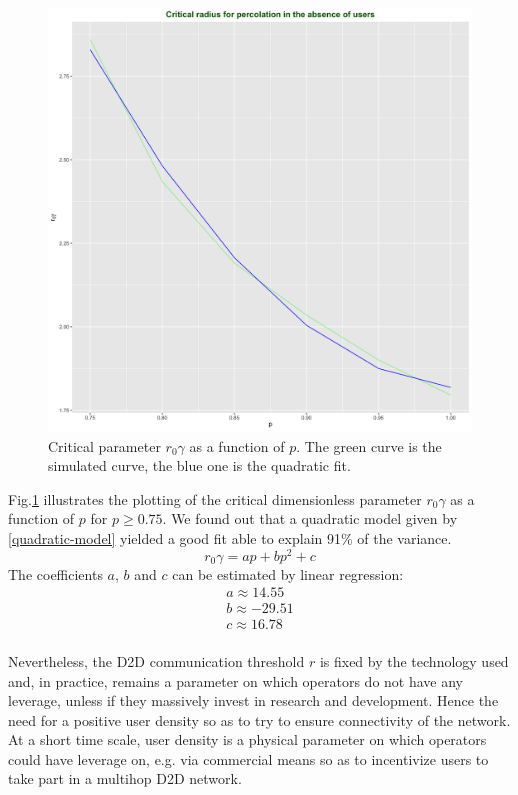 \documentclass[conference]{IEEEtran}
\begin{document}
\begin{figure}[t!]
\centering
\includegraphics[width=\columnwidth]{Figures/critical-radius-lambda_0-quadratic-fit.png}
\caption{Critical parameter $r_{0}\gamma$ as a function of $p$. The green curve is the simulated curve, the blue one is the quadratic fit.}
\label{quadratic-fit-radius}
\end{figure}
\indent Fig.\ref{quadratic-fit-radius} illustrates the plotting of the critical dimensionless parameter $r_{0}\gamma$ as a function of $p$ for $p \geq 0.75$. We found out that a quadratic model given by \eqref{quadratic-model} yielded a good fit able to explain 91\% of the variance.
\begin{equation}
\label{quadratic-model}
r_{0}\gamma = ap + bp^{2} + c
\end{equation}
The coefficients $a$, $b$ and $c$ can be estimated by linear regression:
\begin{equation}
\begin{array}{l}
a \approx 14.55 \\
b \approx -29.51 \\
c \approx 16.78
\end{array}
\end{equation}
\\
\indent Nevertheless, the D2D communication threshold $r$ is fixed by the technology used and, in practice, remains a parameter on which operators do not have any leverage, unless if they massively invest in research and development. Hence the need for a positive user density so as to try to ensure connectivity of the network. At a short time scale, user density is a physical parameter on which operators could have leverage on, e.g. via commercial means so as to incentivize users to take part in a multihop D2D network.
\end{document}
